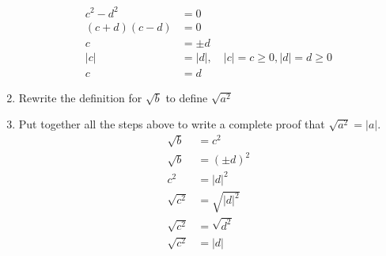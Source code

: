 \documentclass{article}
\begin{document}
\begin{enumerate}[label = \textbf{\alph*)}]
\begin{align*}
			c^2 - d^2 & = 0 \\
			(c + d)(c - d) & = 0 \\
			c & = \pm d \\
			|c| & = |d|, \quad |c| = c \geq 0, |d| = d \geq 0 \\
			c & = d
		\end{align*}
	\item Rewrite the definition for $ \sqrt{b} $ to define $ \sqrt{ a^2 } $
	\item Put together all the steps above to write a complete proof that $ \sqrt{ a^2 } = |a| $.
		\begin{align*}
			\sqrt{ b } & = c^2 \\
			\sqrt{ b } & = (\pm d)^2 \\
			c^2 & = |d|^2 \\
			\sqrt{ c^2 } & = \sqrt{ |d|^2 } \\
			\sqrt{ c^2 } & = \sqrt{ d^2 } \\
			\sqrt{ c^2 } & = |d|
		\end{align*}
\end{enumerate}
\end{document}
